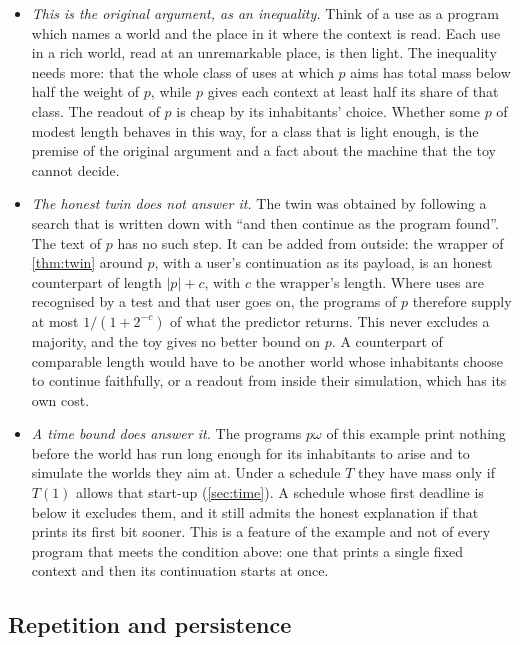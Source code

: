 \begin{itemize}[leftmargin=1.4em,itemsep=1pt,topsep=2pt]
\item \emph{This is the original argument, as an inequality.} Think of a use as a program which names a world
and the place in it where the context is read. Each use in a rich world, read at an unremarkable place, is
then light. The inequality needs more: that the whole class of uses at which $p$ aims has total mass below
half the weight of $p$, while $p$ gives each context at least half its share of that class. The readout of
$p$ is cheap by its inhabitants' choice. Whether some $p$ of modest length behaves in this way, for a class
that is light enough, is the premise of the original argument and a fact about the machine that the toy
cannot decide.
\item \emph{The honest twin does not answer it.} The twin was obtained by following a search that is written
down with ``and then continue as the program found''. The text of $p$ has no such step. It can be added from
outside: the wrapper of \cref{thm:twin} around $p$, with a user's continuation as its payload, is an honest
counterpart of length $|p|+c$, with $c$ the wrapper's length. Where uses are recognised by a test and that
user goes on, the programs of $p$ therefore supply at most $1/(1+2^{-c})$ of what the predictor returns. This
never excludes a majority, and the toy gives no better bound on $p$. A counterpart of comparable length
would have to be another world whose inhabitants choose to continue faithfully, or a readout from inside
their simulation, which has its own cost.
\item \emph{A time bound does answer it.} The programs $p\omega$ of this example print nothing before the
world has run long enough for its inhabitants to arise and to simulate the worlds they aim at. Under a
schedule $T$ they have mass only if $T(1)$ allows that start-up (\cref{sec:time}). A schedule whose first
deadline is below it excludes them, and it still admits the honest explanation if that prints its first bit
sooner. This is a feature of the example and not of every program that meets the condition above: one that
prints a single fixed context and then its continuation starts at once.
\end{itemize}

\subsection{Repetition and persistence}\label{sec:lineage}

